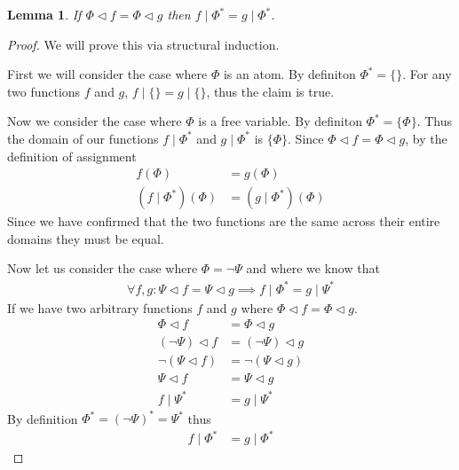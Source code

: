 \documentclass{article}
\newtheorem{lem}{Lemma}
\begin{document}
\begin{lem}
If $\Phi \lhd f = \Phi \lhd g$ then $f \mid \Phi^\ast = g \mid \Phi^\ast$.
\end{lem}
\begin{proof}
We will prove this via structural induction.

First we will consider the case where $\Phi$ is an atom.
By definiton $\Phi^\ast = \{\}$.
For any two functions $f$ and $g$, $f \mid \{\} = g \mid \{\}$,
thus the claim is true.

Now we consider the case where $\Phi$ is a free variable.
By definiton $\Phi^\ast = \{\Phi\}$.
Thus the domain of our functions $f\mid\Phi^\ast$ and $g\mid\Phi^\ast$ is $\{\Phi\}$.
Since $\Phi \lhd f = \Phi \lhd g$, by the definition of assignment
\begin{align*}
f(\Phi) &= g(\Phi) \\
(f\mid\Phi^\ast)(\Phi) &= (g\mid\Phi^\ast)(\Phi)
\end{align*}
Since we have confirmed that the two functions are the same across their entire domains they must be equal.

Now let us consider the case where $\Phi = \neg \Psi$ and where we know that
\begin{align*}
\forall f,g: \Psi \lhd f = \Psi \lhd g \implies f\mid\Phi^\ast=g\mid\Psi^\ast
\end{align*}
If we have two arbitrary functions $f$ and $g$ where $\Phi\lhd f=\Phi\lhd g$.
\begin{align*}
\Phi\lhd f        &= \Phi\lhd g      \\
(\neg\Psi)\lhd f &= (\neg\Psi)\lhd g \\
\neg(\Psi\lhd f) &= \neg(\Psi\lhd g) \\
\Psi\lhd f &= \Psi\lhd g             \\
f\mid\Psi^\ast &= g\mid\Psi^\ast
\end{align*}
By definition $\Phi^\ast = (\neg\Psi)^\ast = \Psi^\ast$ thus
\begin{align*}
f\mid\Phi^\ast &= g\mid\Phi^\ast
\end{align*}


\end{proof}
\end{document}
